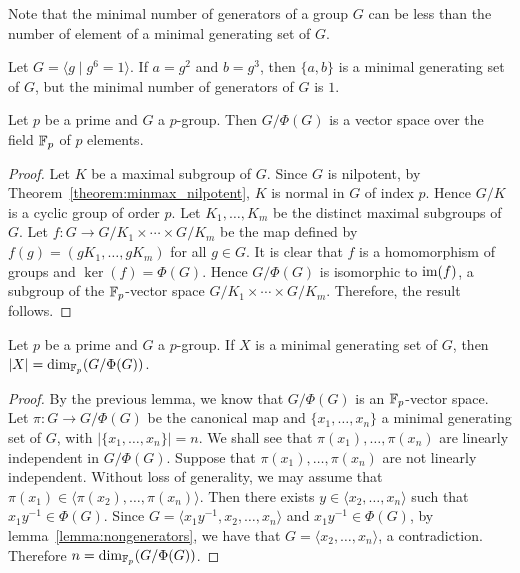 Note that the minimal number of generators of a group $G$ can be less than the number of element of a minimal generating set of $G$.
	
\begin{example}
	Let $G=\langle g\mid g^6=1\rangle$.  If $a=g^2$ and
	$b=g^3$, then $\{a,b\}$ is a minimal generating set of $G$,
	but the minimal number of generators of $G$ is $1$.
\end{example}
	
\begin{lemma}
	\label{lemma:Burnside:minimal}
	Let $p$ be a prime and 
	$G$ a $p$-group. Then $G/\Phi(G)$ is a vector space over the field $\mathbb{F}_p$ of $p$ elements.
\end{lemma}

\begin{proof}
	Let $K$ be a maximal subgroup of $G$. Since $G$ is nilpotent, by Theorem~\ref{theorem:minmax_nilpotent}, 
	$K$ is normal in $G$ of index $p$. Hence $G/K$ is a cyclic group of order $p$. 
	Let $K_1,\dots,K_m$ be the distinct maximal subgroups of $G$.
    Let $f\colon G\rightarrow G/K_1\times\cdots\times G/K_m$ be the map defined by $f(g)=(gK_1,\dots ,gK_m)$ for all $g\in G$.
    It is clear that $f$ is a homomorphism of groups and $\ker(f)=\Phi(G)$. Hence $G/\Phi(G)$ is isomorphic to $\operatorname{im}(f)$, a subgroup of 
    the $\mathbb{F}_p$-vector space $G/K_1\times\cdots\times G/K_m$. Therefore, the result follows.
\end{proof}

\begin{theorem}[Burnside]
	\label{theorem:Burnside:basis}
	Let $p$ be a prime and  $G$ a $p$-group. If $X$ is a minimal generating set of $G$, then $|X|=\dim_{\mathbb{F}_p} (G/\Phi(G))$. 
\end{theorem}


\begin{proof}
	By the previous lemma, we know that $G/\Phi(G)$ is an $\mathbb{F}_p$-vector space. Let $\pi\colon G\to G/\Phi(G)$ be the canonical map
	and $\{x_1,\dots,x_n\}$ a minimal generating set of $G$, with $|\{x_1,\dots,x_n\}|=n$.
	We shall see that $\pi(x_1),\dots,\pi(x_n)$ are linearly independent in $G/\Phi(G)$.  Suppose that
	$\pi(x_1),\dots,\pi(x_n)$ are not linearly independent. Without loss of generality, we may assume that
	$\pi(x_1)\in\langle \pi(x_2),\dots,\pi(x_n)\rangle$. Then there exists $y\in
	\langle x_2,\dots,x_n\rangle$ such that $x_1y^{-1}\in\Phi(G)$. Since $G=\langle x_1y^{-1},x_2,\dots,x_n\rangle$ and $x_1y^{-1}\in\Phi(G)$, by lemma~\ref{lemma:nongenerators}, we have that $G=\langle x_2,\dots, x_n\rangle$, a contradiction.
	Therefore $n=\dim_{\mathbb{F}_p}(G/\Phi(G))$.
\end{proof}


